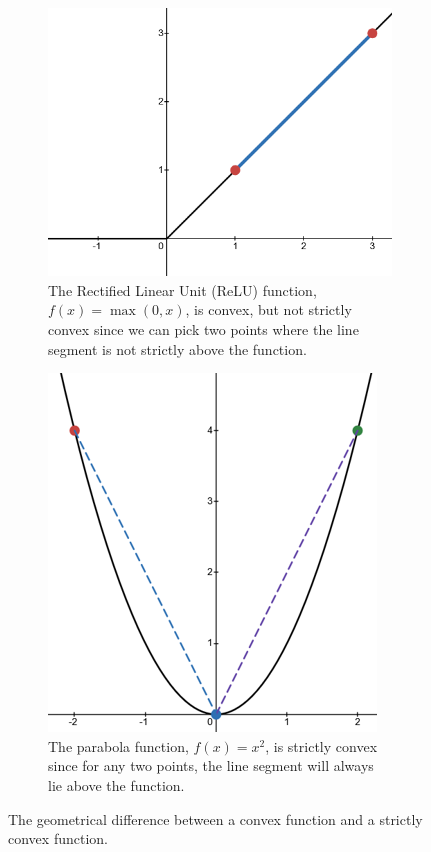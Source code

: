 \begin{figure}[h]
    \begin{subfigure}[b]{0.48\linewidth}
        \centering
        \includegraphics[width=0.8\linewidth]{figures/2background/relu.png}
        \caption{The Rectified Linear Unit (ReLU) function, $f(x) = \max(0, x)$, is convex, but not strictly convex since we can pick two points where the line segment is not strictly above the function.}
        \label{fig:convex_relu}
    \end{subfigure}
    \hfill
    \begin{subfigure}[b]{0.48\linewidth}
        \centering
        \includegraphics[width=0.6\linewidth]{figures/2background/parabola.png}
        \caption{The parabola function, $f(x) = x^2$, is strictly convex since for any two points, the line segment will always lie above the function.}
        \label{fig:strict_convex_parabola}
    \end{subfigure}
    \caption{The geometrical difference between a convex function and a strictly convex function.}
    \label{fig:diff_geometric_convexity}
\end{figure}

